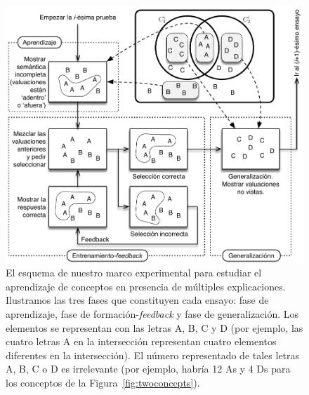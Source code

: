  \begin{figure}[t]
\begin{center}
	\includegraphics[scale=.7]{papers/images_behavior_research_methods/experimentscheme2_sp.pdf}
\end{center}\caption{
El esquema de nuestro marco experimental para estudiar el aprendizaje de conceptos en presencia de múltiples explicaciones. Ilustramos las tres fases que constituyen cada ensayo: fase de aprendizaje, fase de formación-{\em feedback} y fase de generalización. Los elementos se representan con las letras {\sf A}, {\sf B}, {\sf C} y {\sf D} (por ejemplo, las cuatro letras {\sf A} en la intersección representan cuatro elementos diferentes en la intersección). El número representado de tales letras {\sf A}, {\sf B}, {\sf C} o {\sf D} es irrelevante (por ejemplo, habría 12 {\sf A}s y 4 {\sf D}s para los conceptos de la Figura~\ref{fig:twoconcepts}).
  }
\label{fig:trials}
\end{figure}

